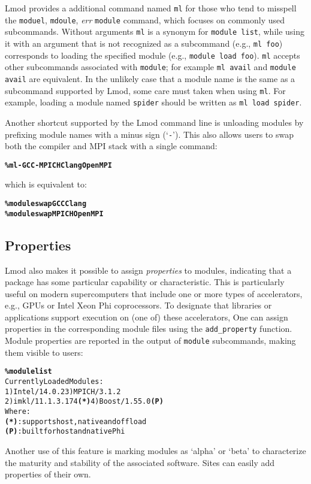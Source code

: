 Lmod provides a additional command named \texttt{\small ml} for those who tend to
misspell the \texttt{\small moduel}, \texttt{\small mdoule}, \emph{err}
\texttt{\small module} command, which focuses on
commonly used subcommands. Without arguments \texttt{\small ml} is a synonym for
\texttt{\small module list}, while using it with an argument that is not
recognized as a subcommand (e.g., \texttt{\small ml foo}) corresponds to loading
the specified module (e.g., \texttt{\small module load foo}).
\texttt{\small ml} accepts other subcommands associated with \texttt{\small module};
for example \texttt{\small ml avail} and \texttt{\small module avail} are equivalent.
In the unlikely case that a module name is the same as a subcommand supported by Lmod, 
some care must taken when using \texttt{\small ml}. For example, loading a module
named \texttt{\small spider} should be written as \texttt{\small ml load spider}.

Another shortcut supported by the Lmod command line is unloading modules by
prefixing module names with a minus sign (`\texttt{\small-}'). This also allows users to swap both the compiler and MPI stack with a single command:
{\small
  \begin{alltt}
      \textbf{\% ml -GCC -MPICH Clang OpenMPI}\
  \end{alltt}
}
\noindent
which is equivalent to:{\small
  \begin{alltt}
      \textbf{\% module swap GCC Clang}
      \textbf{\% module swap MPICH OpenMPI}\
  \end{alltt}
}

\subsection{Properties}

Lmod also makes it possible to assign \emph{properties} to modules,
indicating that a package has some particular capability or
characteristic. This is particularly useful on modern supercomputers that include
one or more types of accelerators, e.g., GPUs or Intel Xeon Phi coprocessors.
To designate that libraries or applications support execution on (one of) these
accelerators, One can assign properties in the corresponding module files
using the \texttt{\small add\_property} function. 
Module properties are reported in the output of \texttt{\small module} subcommands,
making them visible to users:
{\small
\begin{alltt}
  \textbf{\% module list}
  Currently Loaded Modules:
    1) Intel/14.0.2        3) MPICH/3.1.2
    2) imkl/11.1.3.174 \textbf{(*)} 4) Boost/1.55.0 \textbf{(P)}
  Where:
   \textbf{(*)}:  supports host, native and offload
   \textbf{(P)}:  built for host and native Phi
\end{alltt}
}
\noindent Another use of this feature is marking modules as `alpha'
or `beta' to characterize the maturity and stability of the 
associated software. Sites can easily add properties of their own.

